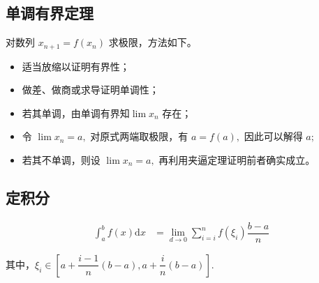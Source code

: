 \subsection{单调有界定理}

对数列 $ x_{n+1} = f(x_n) $ 求极限，方法如下。
\begin{itemize}
    \item 适当放缩以证明有界性；
    \item 做差、做商或求导证明单调性；
    \item 若其单调，由单调有界知$ \lim x_n $ 存在；
    \item 令 $ \lim x_n = a, $ 对原式两端取极限，有 $ a = f(a), $ 因此可以解得 $ a; $ 
    \item 若其不单调，则设 $ \lim x_n = a, $ 再利用夹逼定理证明前者确实成立。
\end{itemize}

\subsection{定积分}

\begin{equation*}
    \begin{aligned}
        \int_a^b f(x)\mathrm{d}x&={\displaystyle\lim_{d\rightarrow 0}}\sum_{i=i}^nf(\xi_i)\dfrac{b-a}{n}
    \end{aligned}
\end{equation*}

其中，$ \xi_i\in\left[a+\dfrac{i-1}{n}(b-a),a+\dfrac{i}{n}(b-a)\right]. $ 